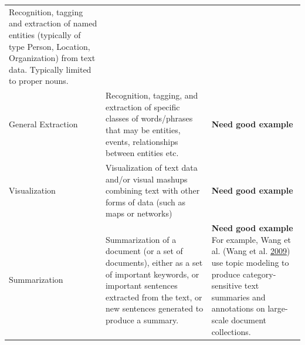 \documentclass[]{krantz}
\begin{document}
\begin{longtable}[]{@{}lll@{}}
\begin{minipage}[t]{0.16\columnwidth}
Recognition, tagging and extraction of named entities (typically of type
Person, Location, Organization) from text data. Typically limited to
proper nouns.\strut
\end{minipage} & \begin{minipage}[t]{0.63\columnwidth}\raggedright\strut
\strut
\end{minipage}\tabularnewline
\begin{minipage}[t]{0.12\columnwidth}\raggedright\strut
General Extraction\strut
\end{minipage} & \begin{minipage}[t]{0.16\columnwidth}\raggedright\strut
Recognition, tagging, and extraction of specific classes of
words/phrases that may be entities, events, relationships between
entities etc.\strut
\end{minipage} & \begin{minipage}[t]{0.63\columnwidth}\raggedright\strut
\textbf{Need good example}\strut
\end{minipage}\tabularnewline
\begin{minipage}[t]{0.12\columnwidth}\raggedright\strut
Visualization\strut
\end{minipage} & \begin{minipage}[t]{0.16\columnwidth}\raggedright\strut
Visualization of text data and/or visual mashups combining text with
other forms of data (such as maps or networks)\strut
\end{minipage} & \begin{minipage}[t]{0.63\columnwidth}\raggedright\strut
\textbf{Need good example}\strut
\end{minipage}\tabularnewline
\begin{minipage}[t]{0.12\columnwidth}\raggedright\strut
Summarization\strut
\end{minipage} & \begin{minipage}[t]{0.16\columnwidth}\raggedright\strut
Summarization of a document (or a set of documents), either as a set of
important keywords, or important sentences extracted from the text, or
new sentences generated to produce a summary.\strut
\end{minipage} & \begin{minipage}[t]{0.63\columnwidth}\raggedright\strut
\textbf{Need good example} For example, Wang et al. (Wang et al.
\protect\hyperlink{ref-wang-09}{2009}) use topic modeling to produce
category-sensitive text summaries and annotations on large-scale
document collections.\strut
\end{minipage}\tabularnewline

\end{longtable}
\end{document}
